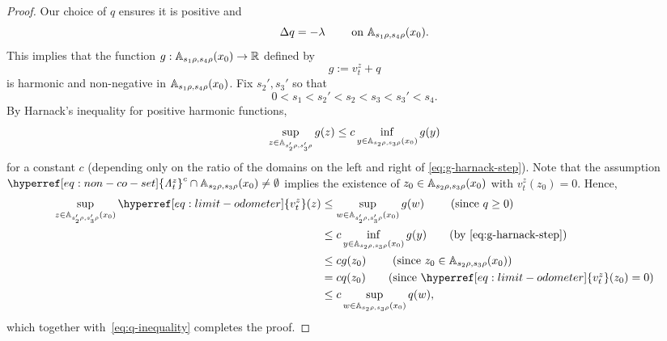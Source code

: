 \documentclass[12pt]{amsart}
\numberwithin{equation}{section}
\newcommand{\cluster}[2]{\hyperref[eq:non-co-set]{\mathit{\Lambda}^{#1}_{#2}}}
\newcommand{\odometer}[2]{\hyperref[eq:limit-odometer]{v^{#1}_{#2}}}
\begin{document}
\begin{proof}
		
		Our choice of $q$ ensures it is positive and 
		\[
		\Delta q = -\lambda \qquad \mbox{ on $\mathbb{A}_{s_1 \rho,s_4 \rho}(x_0)$}.
		\]
		This implies that the function $g: \mathbb{A}_{s_1 \rho,s_4 \rho}(x_0) \to \mathbb{R}$ defined by
		\[
		g := \odometer{z}{t} + q
		\]
		is harmonic and non-negative in $\mathbb{A}_{s_1 \rho,s_4 \rho}(x_0)$.
		Fix $s_2', s_3'$ so that 
		\[
		0 < s_1 < s_2' < s_2 < s_3 < s_3' < s_4.
		\]
		By Harnack's inequality for positive harmonic functions, 
		\begin{equation} \label{eq:g-harnack-step}
		\sup_{z \in \mathbb{A}_{s_2' \rho,s_3' \rho}} g(z) \leq c \inf_{y \in \mathbb{A}_{s_2 \rho,s_3 \rho}(x_0)} g(y)
		\end{equation}
		for a constant $c$ (depending only on the ratio of the domains on the left and right of \eqref{eq:g-harnack-step}). 
		Note that the assumption ${{{\cluster{z}{t}}}}^c \cap  \A_{s_2 \rho,s_3 \rho}(x_0) \neq \emptyset$ implies the existence of $z_0 \in \mathbb{A}_{s_2 \rho,s_3 \rho}(x_0)$ with $ \odometer{z}{t}(z_0) = 0$. 
		Hence, 
		\begin{align*}
		\sup_{z \in \A_{s_2' \rho,s_3' \rho}(x_0)} \odometer{z}{t}(z) &\leq \sup_{w \in \A_{s_2' \rho,s_3' \rho}(x_0)} g(w)  \qquad \mbox{ (since $q \geq 0$)} \\
		&\leq c \inf_{y \in \A_{s_2 \rho,s_3 \rho}(x_0)} g(y) \qquad \mbox{(by \eqref{eq:g-harnack-step})} \\
		&\leq c g(z_0)   \qquad \mbox{ (since $z_0 \in \A_{s_2 \rho,s_3 \rho}(x_0)$)} \\
		&= c q(z_0) \qquad \mbox{(since $\odometer{z}{t}(z_0) = 0$)} \\
		&\leq c \sup_{w \in \A_{s_2 \rho,s_3 \rho}(x_0)} q(w),
		\end{align*}
		which together with~\eqref{eq:q-inequality} completes the proof. 	
	\end{proof}
	
\end{document}
